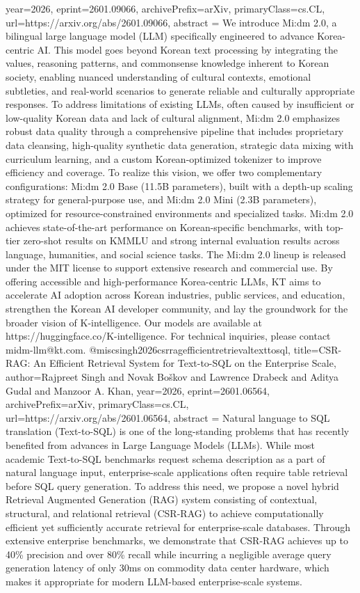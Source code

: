 {      year={2026},
      eprint={2601.09066},
      archivePrefix={arXiv},
      primaryClass={cs.CL},
      url={https://arxiv.org/abs/2601.09066},
      abstract = {We introduce Mi:dm 2.0, a bilingual large language model (LLM) specifically engineered to advance Korea-centric AI. This model goes beyond Korean text processing by integrating the values, reasoning patterns, and commonsense knowledge inherent to Korean society, enabling nuanced understanding of cultural contexts, emotional subtleties, and real-world scenarios to generate reliable and culturally appropriate responses. To address limitations of existing LLMs, often caused by insufficient or low-quality Korean data and lack of cultural alignment, Mi:dm 2.0 emphasizes robust data quality through a comprehensive pipeline that includes proprietary data cleansing, high-quality synthetic data generation, strategic data mixing with curriculum learning, and a custom Korean-optimized tokenizer to improve efficiency and coverage. To realize this vision, we offer two complementary configurations: Mi:dm 2.0 Base (11.5B parameters), built with a depth-up scaling strategy for general-purpose use, and Mi:dm 2.0 Mini (2.3B parameters), optimized for resource-constrained environments and specialized tasks. Mi:dm 2.0 achieves state-of-the-art performance on Korean-specific benchmarks, with top-tier zero-shot results on KMMLU and strong internal evaluation results across language, humanities, and social science tasks. The Mi:dm 2.0 lineup is released under the MIT license to support extensive research and commercial use. By offering accessible and high-performance Korea-centric LLMs, KT aims to accelerate AI adoption across Korean industries, public services, and education, strengthen the Korean AI developer community, and lay the groundwork for the broader vision of K-intelligence. Our models are available at https://huggingface.co/K-intelligence. For technical inquiries, please contact midm-llm@kt.com.}
}@misc{singh2026csrragefficientretrievaltexttosql,
      title={CSR-RAG: An Efficient Retrieval System for Text-to-SQL on the Enterprise Scale}, 
      author={Rajpreet Singh and Novak Boškov and Lawrence Drabeck and Aditya Gudal and Manzoor A. Khan},
      year={2026},
      eprint={2601.06564},
      archivePrefix={arXiv},
      primaryClass={cs.CL},
      url={https://arxiv.org/abs/2601.06564},
      abstract = {Natural language to SQL translation (Text-to-SQL) is one of the long-standing problems that has recently benefited from advances in Large Language Models (LLMs). While most academic Text-to-SQL benchmarks request schema description as a part of natural language input, enterprise-scale applications often require table retrieval before SQL query generation. To address this need, we propose a novel hybrid Retrieval Augmented Generation (RAG) system consisting of contextual, structural, and relational retrieval (CSR-RAG) to achieve computationally efficient yet sufficiently accurate retrieval for enterprise-scale databases. Through extensive enterprise benchmarks, we demonstrate that CSR-RAG achieves up to 40\% precision and over 80\% recall while incurring a negligible average query generation latency of only 30ms on commodity data center hardware, which makes it appropriate for modern LLM-based enterprise-scale systems.}
}
